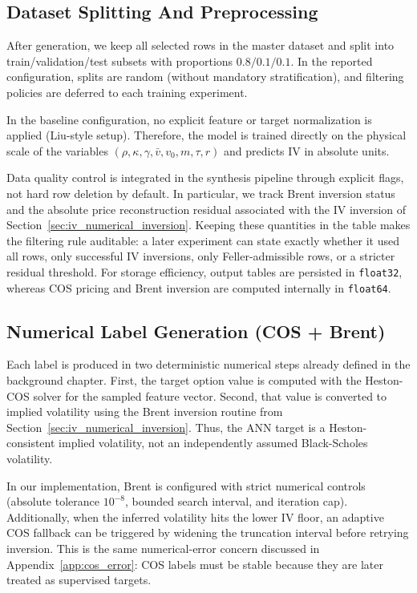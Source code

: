 \subsection{Dataset Splitting And Preprocessing}
After generation, we keep all selected rows in the master dataset and split into train/validation/test subsets with proportions $0.8/0.1/0.1$. In the reported configuration, splits are random (without mandatory stratification), and filtering policies are deferred to each training experiment.

In the baseline configuration, no explicit feature or target normalization is applied (Liu-style setup). Therefore, the model is trained directly on the physical scale of the variables $(\rho,\kappa,\gamma,\bar v,v_0,m,\tau,r)$ and predicts IV in absolute units.

Data quality control is integrated in the synthesis pipeline through explicit flags, not hard row deletion by default. In particular, we track Brent inversion status and the absolute price reconstruction residual associated with the IV inversion of Section~\ref{sec:iv_numerical_inversion}. Keeping these quantities in the table makes the filtering rule auditable: a later experiment can state exactly whether it used all rows, only successful IV inversions, only Feller-admissible rows, or a stricter residual threshold. For storage efficiency, output tables are persisted in \texttt{float32}, whereas COS pricing and Brent inversion are computed internally in \texttt{float64}.

\subsection{Numerical Label Generation (COS + Brent)}
Each label is produced in two deterministic numerical steps already defined in the background chapter. First, the target option value is computed with the Heston-COS solver for the sampled feature vector. Second, that value is converted to implied volatility using the Brent inversion routine from Section~\ref{sec:iv_numerical_inversion}. Thus, the ANN target is a Heston-consistent implied volatility, not an independently assumed Black-Scholes volatility.

In our implementation, Brent is configured with strict numerical controls (absolute tolerance $10^{-8}$, bounded search interval, and iteration cap). Additionally, when the inferred volatility hits the lower IV floor, an adaptive COS fallback can be triggered by widening the truncation interval before retrying inversion. This is the same numerical-error concern discussed in Appendix~\ref{app:cos_error}: COS labels must be stable because they are later treated as supervised targets.

